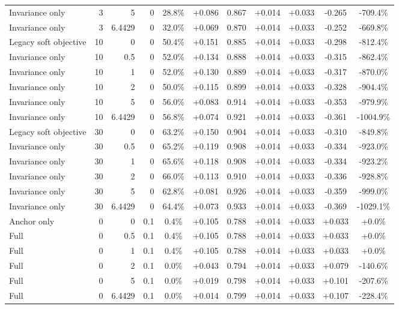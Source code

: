 \begin{table}[htbp]
\begin{tabular}{lrrrccccccc}
Invariance only & 3 & 5 & 0 & 28.8\% & +0.086 & 0.867 & +0.014 & +0.033 & -0.265 & -709.4\% \\
Invariance only & 3 & 6.4429 & 0 & 32.0\% & +0.069 & 0.870 & +0.014 & +0.033 & -0.252 & -669.8\% \\
Legacy soft objective & 10 & 0 & 0 & 50.4\% & +0.151 & 0.885 & +0.014 & +0.033 & -0.298 & -812.4\% \\
Invariance only & 10 & 0.5 & 0 & 52.0\% & +0.134 & 0.888 & +0.014 & +0.033 & -0.315 & -862.4\% \\
Invariance only & 10 & 1 & 0 & 52.0\% & +0.130 & 0.889 & +0.014 & +0.033 & -0.317 & -870.0\% \\
Invariance only & 10 & 2 & 0 & 50.0\% & +0.115 & 0.899 & +0.014 & +0.033 & -0.328 & -904.4\% \\
Invariance only & 10 & 5 & 0 & 56.0\% & +0.083 & 0.914 & +0.014 & +0.033 & -0.353 & -979.9\% \\
Invariance only & 10 & 6.4429 & 0 & 56.8\% & +0.074 & 0.921 & +0.014 & +0.033 & -0.361 & -1004.9\% \\
Legacy soft objective & 30 & 0 & 0 & 63.2\% & +0.150 & 0.904 & +0.014 & +0.033 & -0.310 & -849.8\% \\
Invariance only & 30 & 0.5 & 0 & 65.2\% & +0.119 & 0.908 & +0.014 & +0.033 & -0.334 & -923.0\% \\
Invariance only & 30 & 1 & 0 & 65.6\% & +0.118 & 0.908 & +0.014 & +0.033 & -0.334 & -923.2\% \\
Invariance only & 30 & 2 & 0 & 66.0\% & +0.113 & 0.910 & +0.014 & +0.033 & -0.336 & -928.8\% \\
Invariance only & 30 & 5 & 0 & 62.8\% & +0.081 & 0.926 & +0.014 & +0.033 & -0.359 & -999.0\% \\
Invariance only & 30 & 6.4429 & 0 & 64.4\% & +0.073 & 0.933 & +0.014 & +0.033 & -0.369 & -1029.1\% \\
Anchor only & 0 & 0 & 0.1 & 0.4\% & +0.105 & 0.788 & +0.014 & +0.033 & +0.033 & +0.0\% \\
Full & 0 & 0.5 & 0.1 & 0.4\% & +0.105 & 0.788 & +0.014 & +0.033 & +0.033 & +0.0\% \\
Full & 0 & 1 & 0.1 & 0.4\% & +0.105 & 0.788 & +0.014 & +0.033 & +0.033 & +0.0\% \\
Full & 0 & 2 & 0.1 & 0.0\% & +0.043 & 0.794 & +0.014 & +0.033 & +0.079 & -140.6\% \\
Full & 0 & 5 & 0.1 & 0.0\% & +0.019 & 0.798 & +0.014 & +0.033 & +0.101 & -207.6\% \\
Full & 0 & 6.4429 & 0.1 & 0.0\% & +0.014 & 0.799 & +0.014 & +0.033 & +0.107 & -228.4\% \\

\end{tabular}
\end{table}
